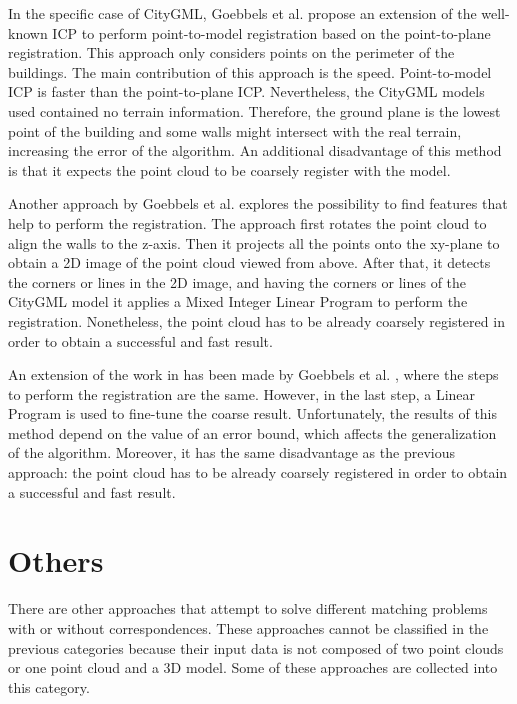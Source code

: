         In the specific case of CityGML, Goebbels et al. \cite{Goebbels_2019_icpcitygml} propose an extension of the well-known ICP
        to perform point-to-model registration based on the point-to-plane registration.
        This approach only considers points on the perimeter of the buildings.
        The main contribution of this approach is the speed. Point-to-model ICP is faster than the point-to-plane ICP.
        Nevertheless, the CityGML models used contained no terrain information. 
        Therefore, the ground plane is the lowest point of the building and some walls might intersect with the real terrain, increasing the error of the algorithm.
        An additional disadvantage of this method is that it expects the point cloud to be coarsely register with the model.

        Another approach by Goebbels et al. \cite{Goebbels_2018_linebased} explores the possibility to find features that help to perform the registration.
        The approach first rotates the point cloud to align the walls to the z-axis. Then it projects all the points onto the 
        xy-plane to obtain a 2D image of the point cloud viewed from above. After that, it detects the corners or lines in the 2D image,
        and having the corners or lines of the CityGML model it applies a Mixed Integer Linear Program to perform the registration.
        Nonetheless, the point cloud has to be already coarsely registered in order to obtain a successful and fast result.

        An extension of the work in \cite{Goebbels_2018_linebased} has been made by Goebbels et al. \cite{Goebbels_2018_alinear}, 
        where the steps to perform the registration are the same.
        However, in the last step, a Linear Program is used to fine-tune the coarse result. 
        Unfortunately, the results of this method depend on the value of an error bound, which affects the generalization of the algorithm.
        Moreover, it has the same disadvantage as the previous approach: 
        the point cloud has to be already coarsely registered in order to obtain a successful and fast result.

    \section{Others}
    There are other approaches that attempt to solve different matching problems with or without correspondences.
    These approaches cannot be classified in the previous categories because their input data is not composed of two point clouds or one point cloud and a 3D model.
    Some of these approaches are collected into this category.

